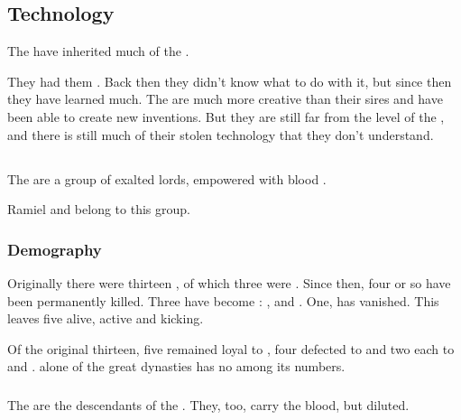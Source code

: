 \subsection{Technology}
\label{Resphan technology}
The \resphain{} have inherited much of the . 

They had them . Back then they didn't know what to do with it, but since then they have learned much. 
The \resphain{} are much more creative than their \bane{} sires and have been able to create new inventions. But they are still far from the level of the \voyagers, and there is still much of their stolen \voyager{} technology that they don't understand. 









\subsection{\Satharioth}
\label{Blood Resphain}
\label{Satharioth}
\label{Sathariah}
The \bloodresphain{} are a group of exalted \resphan{} lords, empowered with \draconic{} blood . 

Ramiel and \Belzirmalach{} belong to this group.





\subsubsection{Demography}
Originally there were thirteen \satharioth, of which three were \resviel. 
Since then, four or so have been permanently killed. 
Three \satharioth{} have become \malachim: , \hs{\Tzerachiel} and \hs\Aryal. 
One, \hs{\Sithiyacaan} has vanished. 
This leaves five \satharioth{} alive, active and kicking. 

Of the original thirteen, five remained loyal to \KiriathSepher, four defected to \Mystraacht{} and two each to \TiphredSerah{} and \Kezerad. 
\Baelzerach{} alone of the great dynasties has no \satharioth{} among its numbers. 





\subsubsection{\Ketherain}
The \ketherain{} are the descendants of the \satharioth. They, too, carry the \draconian{} blood, but diluted. 





